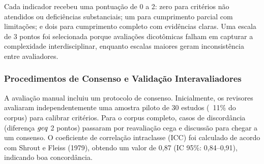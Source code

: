\begin{table}[H]
  \centering
  \caption{Indicadores de qualidade metodológica para estudos ML-etnografia}
  \label{tab:mmat}
\end{table}

Cada indicador recebeu uma pontuação de 0 a 2: zero para critérios não atendidos ou deficiências substanciais; um para cumprimento parcial com limitações; e dois para cumprimento completo com evidências claras. Uma escala de 3 pontos foi selecionada porque avaliações dicotômicas falham em capturar a complexidade interdisciplinar, enquanto escalas maiores geram inconsistência entre avaliadores.

\subsubsection{Procedimentos de Consenso e Validação Interavaliadores}

A avaliação manual incluiu um protocolo de consenso. Inicialmente, os revisores avaliaram independentemente uma amostra piloto de 30 estudos (~11\% do corpus) para calibrar critérios. Para o corpus completo, casos de discordância (diferença $\\geq$ 2 pontos) passaram por reavaliação cega e discussão para chegar a um consenso. O coeficiente de correlação intraclasse (ICC) foi calculado de acordo com Shrout e Fleiss (1979), obtendo um valor de 0,87 (IC 95\%: 0,84–0,91), indicando boa concordância.

